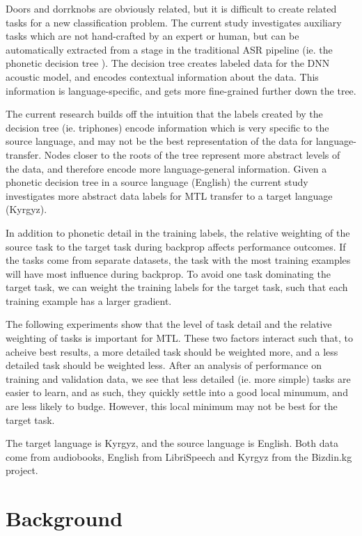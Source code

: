 \documentclass[a4paper]{article}
\begin{document}
Doors and dorrknobs are obviously related, but it is difficult to create related tasks for a new classification problem. The current study investigates auxiliary tasks which are not hand-crafted by an expert or human, but can be automatically extracted from a stage in the traditional ASR pipeline (ie. the phonetic decision tree \cite{young1994tree}). The decision tree creates labeled data for the DNN acoustic model, and encodes contextual information about the data. This information is language-specific, and gets more fine-grained further down the tree.

The current research builds off the intuition that the labels created by the decision tree (ie. triphones) encode information which is very specific to the source language, and may not be the best representation of the data for language-transfer. Nodes closer to the roots of the tree represent more abstract levels of the data, and therefore encode more language-general information. Given a phonetic decision tree in a source language (English) the current study investigates more abstract data labels for MTL transfer to a target language (Kyrgyz). 

In addition to phonetic detail in the training labels, the relative weighting of the source task to the target task during backprop affects performance outcomes. If the tasks come from separate datasets, the task with the most training examples will have most influence during backprop. To avoid one task dominating the target task, we can weight the training labels for the target task, such that each training example has a larger gradient.

The following experiments show that the level of task detail and the relative weighting of tasks is important for MTL. These two factors interact such that, to acheive best results, a more detailed task should be weighted more, and a less detailed task should be weighted less. After an analysis of performance on training and validation data, we see that less detailed (ie. more simple) tasks are easier to learn, and as such, they quickly settle into a good local minumum, and are less likely to budge. However, this local minimum may not be best for the target task.

The target language is Kyrgyz, and the source language is English. Both data come from audiobooks, English from LibriSpeech \cite{panayotov2015} and Kyrgyz from the Bizdin.kg project.




\section{Background}
\end{document}
